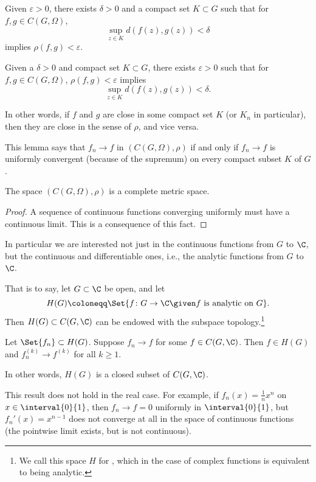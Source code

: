 \begin{lemma}\label{lem7.2}
	\begin{items}
		\item Given $\varepsilon > 0$, there exists $\delta > 0$ and a compact set $K \subset G$ such that for $f, g \in C(G, \Omega)$,
		\[
			\sup_{z \in K} d(f(z), g(z)) < \delta
		\]
		implies $\rho(f, g) < \varepsilon$.

		\item Given a $\delta > 0$ and compact set $K \subset G$, there exists $\varepsilon > 0$ such that for $f, g \in C(G, \Omega)$, $\rho(f, g) < \varepsilon$ implies
		\[
			\sup_{z \in K} d(f(z), g(z)) < \delta.
		\]
	\end{items}
\end{lemma}

In other words, if $f$ and $g$ are close in some compact set $K$ (or $K_n$ in particular), then they are close in the sense of $\rho$, and vice versa.

\begin{remark}
	This lemma says that $f_n \to f$ in $(C(G, \Omega), \rho)$ if and only if $f_n \to f$ is uniformly convergent (because of the supremum) on every compact subset $K$ of $G$.
\end{remark}

\begin{proposition}\label{prop7.3}
	The space $(C(G, \Omega), \rho)$ is a complete metric space.
\end{proposition}

\begin{proof}
	A sequence of continuous functions converging uniformly must have a continuous limit.
	This is a consequence of this fact.
\end{proof}


In particular we are interested not just in the continuous functions from $G$ to $\C$, but the continuous and differentiable ones, i.e., the analytic functions from $G$ to $\C$.

That is to say, let $G \subset \C$ be open, and let
\[
	H(G) \coloneqq \Set{f \colon G \to \C \given f \text{ is analytic on } G}.
\]
Then $H(G) \subset C(G, \C)$ can be endowed with the subspace topology.\footnote{We call this space $H$ for , which in the case of complex functions is equivalent to being analytic.}

\begin{theorem}\label{thm7.4}
	Let $\Set{f_n} \subset H(G)$.
	Suppose $f_n \to f$ for some $f \in C(G, \C)$.
	Then $f \in H(G)$ and $f_n^{(k)} \to f^{(k)}$ for all $k \geq 1$.

	In other words, $H(G)$ is a closed subset of $C(G, \C)$.
\end{theorem}

\begin{remark}
	This result does not hold in the real case.
	For example, if $f_n(x) = \frac{1}{n} x^n$ on $x \in \interval{0}{1}$, then $f_n \to f = 0$ uniformly in $\interval{0}{1}$, but $f_n'(x) = x^{n - 1}$ does not converge at all in the space of continuous functions (the pointwise limit exists, but is not continuous).
\end{remark}
